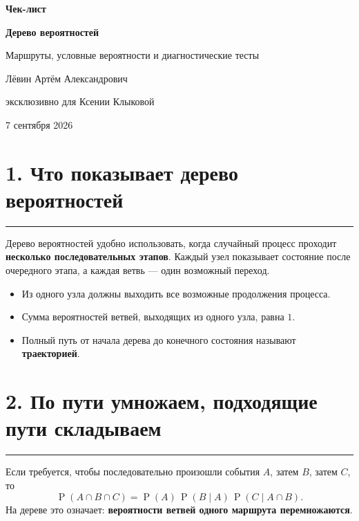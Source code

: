 \documentclass[a4paper,12pt]{article}
\newcommand{\sectionrule}{\vspace{-0.4em}\textcolor{accent}{\rule{\linewidth}{0.7pt}}\vspace{0.4em}}
\newcommand{\key}[1]{\textcolor{darkaccent}{\textbf{#1}}}
\newcommand{\prob}[1]{\operatorname{P}\!\left(#1\right)}
\begin{document}
\begin{titlepage}
\centering
\vspace*{2.1cm}
{\Large\textcolor{darkaccent}{\textbf{Чек-лист}}\par}
\vspace{0.7cm}
{\Huge\textbf{Дерево вероятностей}\par}
\vspace{0.35cm}
{\Large\textcolor{textgray}{Маршруты, условные вероятности и диагностические тесты}\par}
\vspace{2.2cm}
{\large Лёвин Артём Александрович\par}
\vspace{0.2cm}
{\large эксклюзивно для Ксении Клыковой\par}
\vfill
{\large 7 сентября 2026\par}
\vspace{1.7cm}
\end{titlepage}

\section*{1. Что показывает дерево вероятностей}
\sectionrule
Дерево вероятностей удобно использовать, когда случайный процесс проходит \key{несколько последовательных этапов}. Каждый узел показывает состояние после очередного этапа, а каждая ветвь --- один возможный переход.
\begin{itemize}
\item Из одного узла должны выходить все возможные продолжения процесса.
\item Сумма вероятностей ветвей, выходящих из одного узла, равна \(1\).
\item Полный путь от начала дерева до конечного состояния называют \key{траекторией}.
\end{itemize}

\section*{2. По пути умножаем, подходящие пути складываем}
\sectionrule
Если требуется, чтобы последовательно произошли события \(A\), затем \(B\), затем \(C\), то
\[
\prob{A\cap B\cap C}=\prob{A}\,\prob{B\mid A}\,\prob{C\mid A\cap B}.
\]
На дереве это означает: \key{вероятности ветвей одного маршрута перемножаются}.
\end{document}
